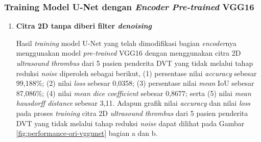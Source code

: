 \subsubsection{Training Model U-Net dengan \textit{Encoder} \textit{Pre-trained} VGG16}

\begin{enumerate}
	\item \textbf{Citra 2D tanpa diberi filter \textit{denoising}}
	
	Hasil \textit{training} model U-Net yang telah dimodifikasi bagian \textit{encoder}nya menggunakan model \textit{pre-trained} VGG16 dengan menggunakan citra 2D \textit{ultrasound} \textit{thrombus} dari 5 pasien penderita DVT yang tidak melalui tahap reduksi \textit{noise} diperoleh sebagai berikut, (1) persentase nilai \textit{accuracy} sebesar 99,188\%; (2) nilai \textit{loss} sebesar 0,0358; (3) persentase nilai \textit{mean} IoU sebesar 87,086\%; (4) nilai \textit{mean} \textit{dice coefficient} sebesar 0,8677; serta (5) nilai \textit{mean} \textit{hausdorff distance} sebesar 3,11. Adapun grafik nilai \textit{accuracy} dan nilai \textit{loss} pada proses \textit{training} citra 2D \textit{ultrasound} \textit{thrombus} dari 5 pasien penderita DVT yang tidak melalui tahap reduksi \textit{noise} dapat dilihat pada Gambar \ref{fig:performance-ori-vggunet} bagian a dan b.
	

\end{enumerate}
